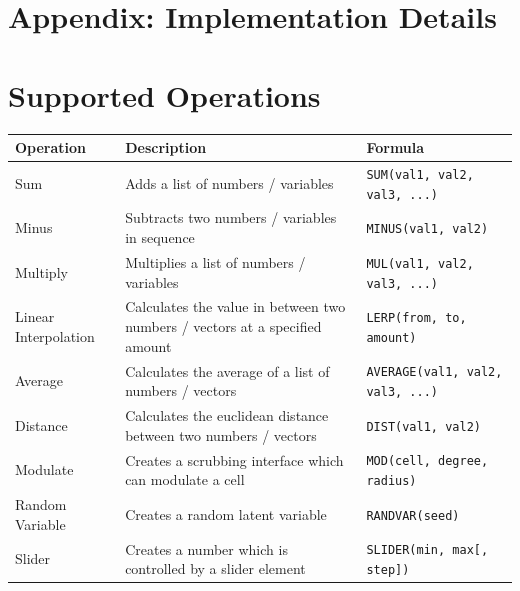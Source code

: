 \documentclass[letterpaper]{article}
\begin{document}



\onecolumn

\pagebreak

\normalsize


\section*{Appendix: Implementation Details}

\section*{Supported Operations}

\renewcommand{\arraystretch}{1.5}

\begin{center}
    \begin{tabular}{ | l | p{6cm} | p{5.6cm} |}
    \hline \textbf{Operation} & \textbf{Description} & \textbf{Formula} \\ \hline
    Sum & Adds a list of numbers / variables  & \texttt{SUM(val1, val2, val3, ...)} \\ \hline
    Minus & Subtracts two numbers / variables in sequence  & \texttt{MINUS(val1, val2)} \\ \hline
    Multiply & Multiplies a list of numbers / variables  & \texttt{MUL(val1, val2, val3, ...)} \\ \hline
    Linear Interpolation & Calculates the value in between two numbers / vectors at a specified amount  & \texttt{LERP(from, to, amount)} \\ \hline
    Average & Calculates the average of a list of numbers / vectors  & \texttt{AVERAGE(val1, val2, val3, ...)} \\ \hline
    Distance & Calculates the euclidean distance between two numbers / vectors  & \texttt{DIST(val1, val2)} \\ \hline
    Modulate & Creates a scrubbing interface which can modulate a cell  & \texttt{MOD(cell, degree, radius)} \\ \hline
    Random Variable & Creates a random latent variable  & \texttt{RANDVAR(seed)} \\ \hline
    Slider & Creates a number which is controlled by a slider element  & \texttt{SLIDER(min, max[, step])} \\ \hline
    \end{tabular}
\end{center}
\end{document}
